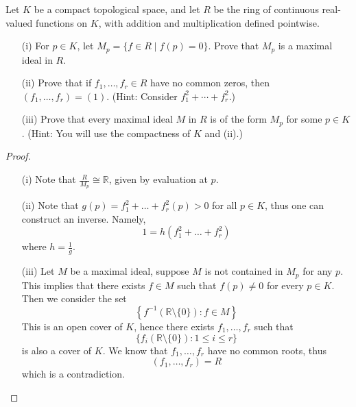 \documentclass[openany]{book}
\newcommand{\R}{\mathbb{R}}
\begin{document}
\begin{prob}[4.17]
    Let \( K \) be a compact topological space, and let \( R \) be the ring of continuous real-valued functions on \( K \), with addition and multiplication defined pointwise.
    \begin{itemize}
        \item[(i)] For \( p \in K \), let \( M_p = \{f \in R \mid f(p) = 0\} \). Prove that \( M_p \) is a maximal ideal in \( R \).
        \item[(ii)] Prove that if \( f_1, \ldots, f_r \in R \) have no common zeros, then \( (f_1, \ldots, f_r) = (1) \). (Hint: Consider \( f_1^2 + \cdots + f_r^2 \).)
        \item[(iii)] Prove that every maximal ideal \( M \) in \( R \) is of the form \( M_p \) for some \( p \in K \). (Hint: You will use the compactness of \( K \) and (ii).)
    \end{itemize}
\end{prob}
\begin{proof}
    \begin{itemize}
        \item[(i)] Note that $\frac{R}{M_p}\cong\R$, given by evaluation at $p$.
        \item[(ii)] Note that $g(p)=f_1^2+\dots+f_r^2(p)>0$ for all $p\in K$, thus one can construct an inverse. Namely, 
        \begin{equation*}
            1=h(f_1^2+\dots+f_r^2)
        \end{equation*}
        where $h=\frac{1}{g}$.
        \item[(iii)] Let $M$ be a maximal ideal, suppose $M$ is not contained in $M_p$ for any $p$. This implies that there exists $f\in M$ such that $f(p)\neq 0$ for every $p\in K$. Then we consider the set 
        \begin{equation*}
            \left\{f^{-1}(\R\setminus\{0\}):f\in M\right\}
        \end{equation*}
        This is an open cover of $K$, hence there exists $f_1,\dots, f_r$ such that 
        \begin{equation*}
            \{f_i(\R\setminus\{0\}): 1\leq i\leq r\}
        \end{equation*}
        is also a cover of $K$. We know that $f_1,\dots, f_r$ have no common roots, thus 
        \begin{equation*}
            (f_1,\dots, f_r)=R
        \end{equation*}
        which is a contradiction.
    \end{itemize}
\end{proof}
\end{document}
